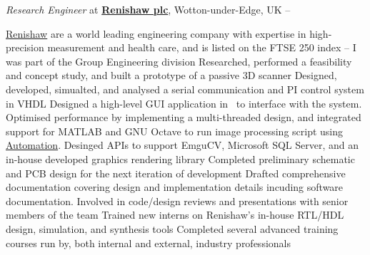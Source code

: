 \documentclass[a4paper,10pt,oneside]{article}
\begin{document}
\begin{body}
\textit{Research Engineer} at
\href{https://www.renishaw.com/}
{\textbf{Renishaw plc}},
Wotton-under-Edge, UK
\hfill
{} --
{}
\begin{detailwithoutsubheading}
\BulletItem
\href{https://www.renishaw.com}{Renishaw} are a world leading engineering company with expertise in high-precision measurement and health care, and is listed on the FTSE 250 index -- I was part of the Group Engineering division
\BulletItem
Researched, performed a feasibility and concept study, and built a prototype of a passive 3D scanner
\BulletItem
Designed, developed, simualted, and analysed a serial communication and PI control system in VHDL 
\BulletItem
Designed a high-level GUI application in \Csharp \ to interface with the system. Optimised performance by implementing a multi-threaded design, and integrated support for MATLAB and GNU Octave to run image processing script using \href{https://msdn.microsoft.com/en-us/library/windows/desktop/ms221375(v=vs.85).aspx}{Automation}. Desinged APIs to support EmguCV, Microsoft SQL Server, and an in-house developed graphics rendering library
\BulletItem
Completed preliminary schematic and PCB design for the next iteration of development
\BulletItem
Drafted comprehensive documentation covering design and implementation details incuding software documentation. Involved in code/design reviews and presentations with senior members of the team
\BulletItem
Trained new interns on Renishaw's in-house RTL/HDL design, simulation, and synthesis tools
\BulletItem
Completed several advanced training courses run by, both internal and external, industry professionals
\end{detailwithoutsubheading}


\end{body}
\end{document}
